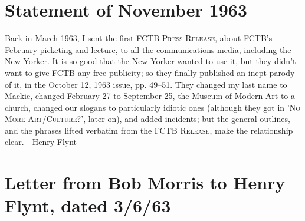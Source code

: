 \vfill

\section*{\normalsize Statement of November 1963}

Back in March 1963, I sent the first \textsc{FCTB Press Release}, about FCTB's 
February picketing and lecture, to all the communications media, including 
the New Yorker. It is so good that the New Yorker wanted to use it, but 
they didn't want to give FCTB any free publicity; so they finally published 
an inept parody of it, in the October 12, 1963 issue, pp. 49--51. They 
changed my last name to Mackie, changed February 27 to September 25, the 
Museum of Modern Art to a church, changed our slogans to particularly 
idiotic ones (although they got in '\textsc{No More Art/Culture?}', later on), 
and added incidents; but the general outlines, and the phrases lifted verbatim 
from the \textsc{FCTB Release}, make the relationship clear.---Henry Flynt 

\clearpage

\section*{{\normalsize Letter from Bob Morris to Henry Flynt, dated 3/6/63}}


\vfill 


